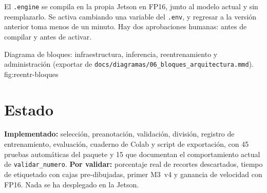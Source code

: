 El \texttt{.engine} se compila en la propia Jetson en FP16, junto al
modelo actual y sin reemplazarlo. Se activa cambiando una variable del
\texttt{.env}, y regresar a la versión anterior toma menos de un minuto.
Hay dos aprobaciones humanas: antes de compilar y antes de activar.

  {Diagrama de bloques: infraestructura, inferencia, reentrenamiento y
   administración (exportar de
   \texttt{docs/diagramas/06\_bloques\_arquitectura.mmd}).}
  {fig:reentr-bloques}

\section{Estado}

\begin{nota}
\textbf{Implementado:} selección, preanotación, validación, división,
registro de entrenamiento, evaluación, cuaderno de Colab y script de
exportación, con 45 pruebas automáticas del paquete y 15 que documentan
el comportamiento actual de \texttt{validar\_numero}. \textbf{Por validar:} porcentaje
real de recortes descartados, tiempo de etiquetado con cajas
pre-dibujadas, primer M3~v4 y ganancia de velocidad con FP16. Nada se ha
desplegado en la Jetson.
\end{nota}
